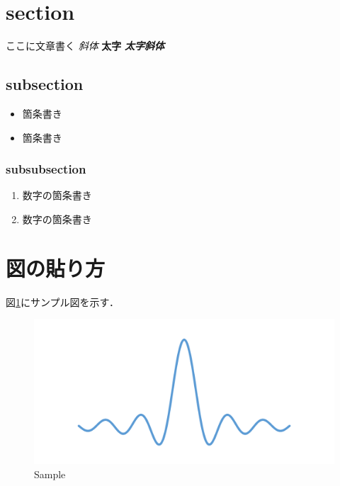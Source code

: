 \section{section}\label{section}

ここに文章書く \emph{斜体} \textbf{太字} \textbf{\emph{太字斜体}}

\subsection{subsection}\label{subsection}

\begin{itemize}
\tightlist
\item
  箇条書き
\item
  箇条書き
\end{itemize}

\subsubsection{subsubsection}\label{subsubsection}

\begin{enumerate}
\def\labelenumi{\arabic{enumi}.}
\tightlist
\item
  数字の箇条書き
\item
  数字の箇条書き
\end{enumerate}

\section{図の貼り方}\label{ux56f3ux306eux8cbcux308aux65b9}

図\ref{fig:sample}にサンプル図を示す．

\begin{figure}[ht]
\centering
\includegraphics[width=12.00000cm]{./fig/sample.png}
\caption{Sample\label{fig:sample}}
\end{figure}

